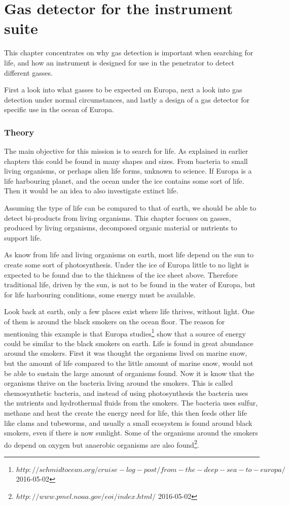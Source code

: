 \documentclass[10pt,a4paper,draft]{report}
\begin{document}
\chapter{Gas detector for the instrument suite}

This chapter concentrates on why gas detection is important when searching for life, and how an instrument is designed for use in the penetrator to detect different gasses. \par
First a look into what gasses to be expected on Europa, next a look into gas detection under normal circumstances, and lastly a design of a gas detector for specific use in the ocean of Europa. \par


\subsection{Theory}
The main objective for this mission is to search for life. As explained in earlier chapters this could be found in many shapes and sizes. From bacteria to small living organisms, or perhaps alien life forms, unknown to science. If Europa is a life harbouring planet, and the ocean under the ice contains some sort of life. Then it would be an idea to also investigate extinct life. \par
Assuming the type of life can be compared to that of earth, we should be able to detect bi-products from living organisms. This chapter focuses on gasses, produced by living organisms, decomposed organic material or nutrients to support life.\par  
As know from life and living organisms on earth, most life depend on the sun to create some sort of photosynthesis. Under the ice of Europa little to no light is expected to be found due to the thickness of the ice sheet above. Therefore traditional life, driven by the sun, is not to be found in the water of Europa, but for life harbouring conditions, some energy must be available. \par
Look back at earth, only a few places exist where life thrives, without light. One of them is around the black smokers on the ocean floor. The reason for mentioning this example is that Europa studies\footnote{$http://schmidtocean.org/cruise-log-post/from-the-deep-sea-to-europa/$ 2016-05-02} show that a source of energy could be similar to the black smokers on earth. Life is found in great abundance around the smokers. First it was thought the organisms lived on marine snow, but the amount of life compared to the little amount of marine snow, would not be able to sustain the large amount of organisms found. Now it is know that the organisms thrive on the bacteria living around the smokers. This is called chemosynthetic bacteria, and instead of using photosynthesis the bacteria uses the nutrients and hydrothermal fluids from the smokers. The bacteria uses sulfur, methane and heat the create the energy need for life, this then feeds other life like clams and tubeworms, and usually a small ecosystem is found around black smokers, even if there is now sunlight. Some of the organisms around the smokers do depend on oxygen but anaerobic organisms are also found\footnote{$http://www.pmel.noaa.gov/eoi/index.html/$ 2016-05-02}.\par
\end{document}
